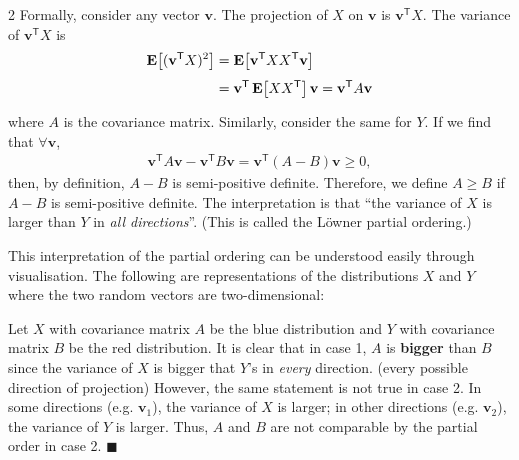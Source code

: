 \documentclass{article}
\DeclareMathOperator{\Exp}{\text{\textbf{E}}}
\newcommand{\E}[2][]{\Exp_{#1}\!\left[#2\right]}
\newcommand{\asDemonstrated}{\null\nobreak\hfill\ensuremath{\blacksquare}}
\newcommand{\T}{^{\mathsf{T}}}
\newcommand{\vv}{\mathbf{v}}
\begin{document}
\begin{multicols}{2}
Formally, consider any vector $\vv$.
The projection of $X$ on $\vv$ is $\vv\T X$.
The variance of $\vv\T X$ is 
\begin{align*}
	\E{(\vv\T X)^2}
	&= \E{\vv\T XX\T\vv} \\
	&= \vv\T\E{XX\T}\vv
	= \vv\T A\vv
\end{align*}
where $A$ is the covariance matrix.
Similarly, consider the same for $Y$.
If we find that $\forall\vv$,
\begin{align*}
	\vv\T A\vv - \vv\T B\vv
	= \vv\T (A - B)\vv
	\geq 0,
\end{align*}
then, by definition, $A-B$ is semi-positive definite.
Therefore, we define $A\geq B$ if $A-B$ is semi-positive definite.
The interpretation is that
``the variance of $X$ is larger than $Y$ in \emph{all directions}''.
(This is called the L\"{o}wner partial ordering.)

This interpretation of the partial ordering can be understood easily through visualisation.
The following are representations of the distributions $X$ and $Y$ where the
two random vectors are two-dimensional:
\begin{center}
	
\end{center}
Let $X$ with covariance matrix $A$ be the blue distribution and $Y$ with
covariance matrix $B$ be the red distribution.
It is clear that in case 1, $A$ is \textbf{bigger} than $B$ since the variance of $X$ is
bigger that $Y$'s in \emph{every} direction. (every possible direction of projection)
However, the same statement is not true in case 2.
In some directions (e.g.\! $\vv_1$), the variance of $X$ is larger;
in other directions (e.g.\! $\vv_2$), the variance of $Y$ is larger.
Thus, $A$ and $B$ are not comparable by the partial order in case 2.
\asDemonstrated

\end{multicols}
\end{document}
